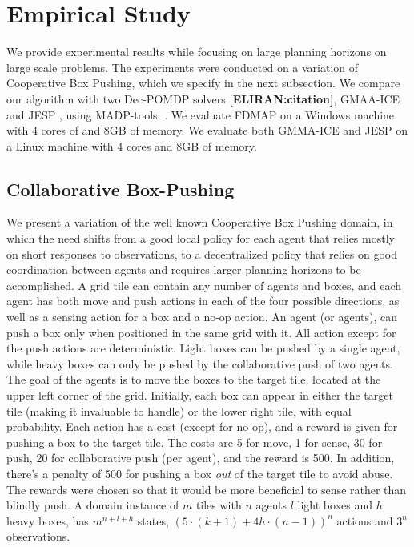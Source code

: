 \documentclass[letterpaper]{article} %
\newcommand{\eliran}[1]{\textbf{[\color{red}ELIRAN:#1]}}
\newcommand{\cbp}[0]{Collaborative Box-Pushing}
\begin{document}
\section{Empirical Study}
We provide experimental results while focusing on large planning horizons on large scale problems.
The experiments were conducted on a variation of Cooperative Box Pushing, which we specify in the next subsection.
We compare our algorithm with two Dec-POMDP solvers \eliran{citation}, GMAA-ICE \cite{} and JESP \cite{}, using MADP-tools. \cite{}.
We evaluate FDMAP on a Windows machine with 4 cores of and 8GB of memory.
We evaluate both GMMA-ICE and JESP on a Linux machine with 4 cores and 8GB of memory.


\subsection{\cbp}
We present a variation of the well known Cooperative Box Pushing domain, in which the need shifts from a good local policy for each agent that relies mostly on short responses to observations, to a decentralized policy that relies on good coordination between agents and requires larger planning horizons to be accomplished. A grid tile can contain any number of agents and boxes, and each agent has both move and push actions in each of the four possible directions, as well as a sensing action for a box and a no-op action.
An agent (or agents), can push a box only when positioned in the same grid with it.
All action except for the push actions are deterministic.
Light boxes can be pushed by a single agent, while heavy boxes can only be pushed by the collaborative push of two agents.
The goal of the agents is to move the boxes to the target tile, located at the upper left corner of the grid.
Initially, each box can appear in either the target tile (making it invaluable to handle) or the lower right tile, with equal probability.
Each action has a cost (except for no-op), and a reward is given for pushing a box to the target tile. The costs are 5 for move, 1 for sense, 30 for push, 20 for collaborative push (per agent), and the reward is 500. In addition, there's a penalty of 500 for pushing a box \emph{out} of the target tile to avoid abuse.
The rewards were chosen so that it would be more beneficial to sense rather than blindly push.
A domain instance of $m$ tiles with $n$ agents $l$ light boxes and $h$ heavy boxes, has $m^{n+l+h}$ states, $(5\cdot(k+1)+4h\cdot(n-1))^n$ actions and $3^n$ observations. 
\end{document}

